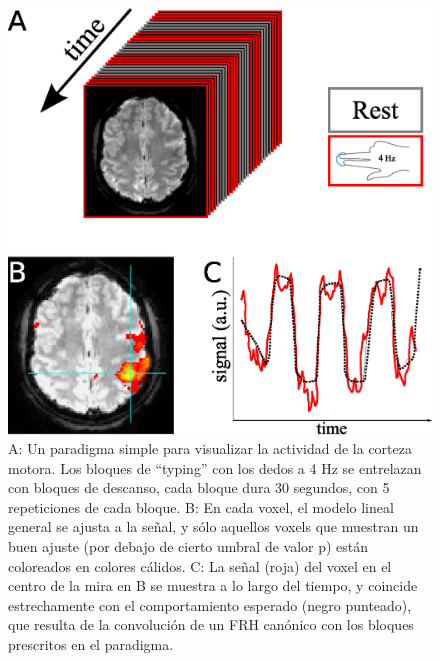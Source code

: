 \documentclass[12pt,a5,twoside]{book}
\begin{document}
\begin{figure}
	\centering
    \includegraphics [scale=0.7,center] {example_fMRI.eps}
    \caption{A: Un paradigma simple para visualizar la actividad de la corteza motora. Los bloques de ``typing'' con los dedos a 4 Hz se entrelazan con bloques de descanso, cada bloque dura 30 segundos, con 5 repeticiones de cada bloque. B: En cada voxel, el modelo lineal general se ajusta a la señal, y sólo aquellos voxels que muestran un buen ajuste (por debajo de cierto umbral de valor p) están coloreados en colores cálidos. C: La señal (roja) del voxel en el centro de la mira en B se muestra a lo largo del tiempo, y coincide estrechamente con el comportamiento esperado (negro punteado), que resulta de la convolución de un FRH canónico con los bloques prescritos en el paradigma.}
    \label{F:example_fMRI}
\end{figure}
\end{document}
